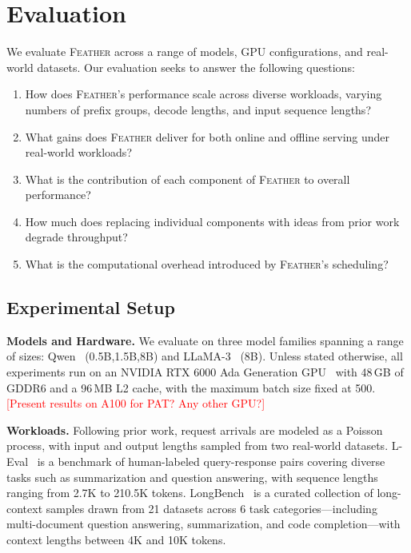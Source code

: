 \section{Evaluation}
\label{sec:eval}
We evaluate \textsc{Feather} across a range of models, GPU configurations, and real-world  datasets. Our evaluation seeks to answer the following questions:
\begin{enumerate}
    \item How does \textsc{Feather}'s performance scale across diverse workloads, varying numbers of prefix groups, decode lengths, and input sequence lengths?
    \item What gains does \textsc{Feather} deliver for both online and offline serving under real-world workloads?
    \item What is the contribution of each component of \textsc{Feather} to overall performance?
    \item How much does replacing individual components with ideas from prior work degrade throughput?
    \item What is the computational overhead introduced by \textsc{Feather}'s scheduling?
\end{enumerate}

\subsection{Experimental Setup}

\textbf{Models and Hardware.}
We evaluate on three model families spanning a range of sizes: Qwen~\cite{qwen} (0.5B,1.5B,8B) and LLaMA-3~\cite{llama3modelcard} (8B). Unless stated otherwise, all experiments run on an NVIDIA RTX 6000 Ada Generation GPU~\cite{nvidia_rtx6000_datasheet} with 48\,GB of GDDR6 and a 96\,MB L2 cache, with the maximum batch size fixed at 500. \textcolor{red}{[Present results on A100 for PAT? Any other GPU?]}

\textbf{Workloads.}
Following prior work, request arrivals are modeled as a Poisson process, with input and output lengths sampled from two real-world datasets. L-Eval~\cite{an2023leval} is a benchmark of human-labeled query-response pairs covering diverse tasks such as summarization and question answering, with sequence lengths ranging from 2.7K to 210.5K tokens. LongBench~\cite{bai2024longbench2} is a curated collection of long-context samples drawn from 21 datasets across 6 task categories—including multi-document question answering, summarization, and code completion—with context lengths between 4K and 10K tokens.

